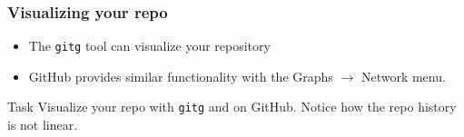 \begin{frame}

\frametitle{Visualizing your repo}

\begin{itemize}
	\item The \texttt{gitg} tool can visualize your repository
	\item GitHub provides similar functionality with the Graphs $\rightarrow$ Network menu.
\end{itemize}

\begin{block}{Task}
	Visualize your repo with \texttt{gitg} and on GitHub. Notice how the repo history is not linear. 
\end{block}

\end{frame}
